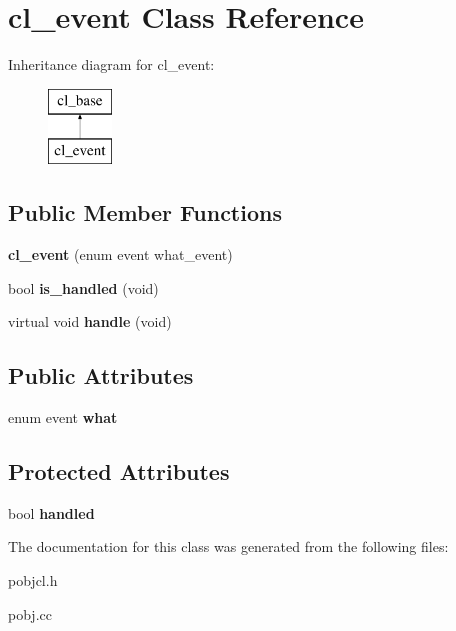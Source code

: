 \hypertarget{classcl__event}{
\section{cl\_\-event Class Reference}
\label{classcl__event}
}
Inheritance diagram for cl\_\-event:\begin{figure}[H]
\begin{center}
\leavevmode
\includegraphics[height=2.000000cm]{classcl__event}
\end{center}
\end{figure}
\subsection*{Public Member Functions}
\begin{DoxyCompactItemize}
\item 
\hypertarget{classcl__event_a51feb0f638fed8930a604a648b6245c6}{
{\bfseries cl\_\-event} (enum event what\_\-event)}
\label{classcl__event_a51feb0f638fed8930a604a648b6245c6}

\item 
\hypertarget{classcl__event_aadc059c23d68bae87ca2877d79cb07df}{
bool {\bfseries is\_\-handled} (void)}
\label{classcl__event_aadc059c23d68bae87ca2877d79cb07df}

\item 
\hypertarget{classcl__event_a49d88839722b9ae1923291685bd2409a}{
virtual void {\bfseries handle} (void)}
\label{classcl__event_a49d88839722b9ae1923291685bd2409a}

\end{DoxyCompactItemize}
\subsection*{Public Attributes}
\begin{DoxyCompactItemize}
\item 
\hypertarget{classcl__event_a1c24ef7077a204036b71cf57f12f2b36}{
enum event {\bfseries what}}
\label{classcl__event_a1c24ef7077a204036b71cf57f12f2b36}

\end{DoxyCompactItemize}
\subsection*{Protected Attributes}
\begin{DoxyCompactItemize}
\item 
\hypertarget{classcl__event_ad3d054e066f076207569b3f3151b1a23}{
bool {\bfseries handled}}
\label{classcl__event_ad3d054e066f076207569b3f3151b1a23}

\end{DoxyCompactItemize}


The documentation for this class was generated from the following files:\begin{DoxyCompactItemize}
\item 
pobjcl.h\item 
pobj.cc\end{DoxyCompactItemize}
